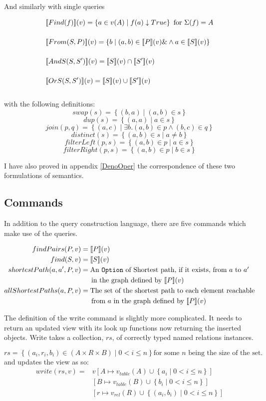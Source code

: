 \documentclass[12pt,a4paper,twoside,openright]{report}
\newcommand\codeName[1]{\texttt{#1}}
\newcommand{\db}[1]{{\bf [\![}#1{\bf ]\!]}}
\newcommand{\deno}[1]{\db{#1}(v)}
\newcommand{\setComp}[2]{\left\lbrace #1 \mid #2 \right\rbrace}
\begin{document}
And similarly with single queries

\begin{align}
&\deno{Find(f)} = \setComp{a \in v(A)}{f(a)\downarrow True} \mbox{ for $\Sigma(f) = A$} \\[3ex]
&\deno{From(S, P)} =  \setComp{b}{(a, b) \in \deno{P} \&\wedge a \in \deno{S}}   \\[3ex]
&\deno{AndS(S, S')} = \deno{S} \cap \deno{S'} \\[3ex]
&\deno{OrS(S, S')} = \deno{S} \cup \deno{S'} \\[3ex]
\end{align}
with the following definitions:
\[ swap(s) = \setComp{(b,a)}{(a, b) \in s}\]
\[ dup(s) = \setComp{(a,a)}{a \in s}\]
\[ join(p, q) = \setComp{(a, c)}{ \exists b. (a, b) \in p \wedge (b, c) \in q}\]
\[ distinct(s) = \setComp{(a, b) \in s} { a \neq b} \]
\[ filterLeft(p, s) = \setComp{(a, b) \in p}{a \in s}\]
\[ filterRight(p, s) = \setComp{(a, b) \in p}{b \in s}\]
    
   I have also proved in appendix \ref{DenoOper} the correspondence of these two formulations of semantics.
\subsection{Commands}
In addition to the query construction language, there are five commands which make use of the queries.

\[\label{CommandSemantics}
\begin{split}
findPairs(P, v) &= \deno{P}\\
find(S, v) &=  \deno{S}\\
shortestPath(a, a', P, v) &= \mbox{An \codeName{Option} of Shortest path, if it exists, from $a$ to $a'$}\\
& \indent \mbox{in the graph defined by $\deno{P}$}\\
allShortestPaths(a, P, v) &= \mbox{The set of the shortest path to each element reachable}\\
 & \indent \mbox{from $a$ in the graph defined by $\deno{P}$}\\
\end{split}\]

The definition of the write command is slightly more complicated. It needs to return an updated view with its look up functions now returning the inserted objects. Write takes a collection, $rs$, of correctly typed named relations instances.


\[rs = \setComp{(a_i, r_i, b_i) \in (A \times R \times B)}{0 < i \leqslant n} \mbox{for some $n$ being the size of the set.}\]
and updates the view as so: 
\begin{equation}
\begin{split}
write(rs, v) = &v\left[A \mapsto v_{table}(A) \cup \setComp{a_i}{0 < i \leqslant n}\right]\\
& \left[B \mapsto v_{table}(B) \cup \setComp{b_i}{0 < i \leqslant n}\right]\\
& \left[r \mapsto v_{rel}(R) \cup \setComp{(a_i, b_i)}{0 < i \leqslant n}\right] 
\end{split}
\end{equation}
\end{document}
